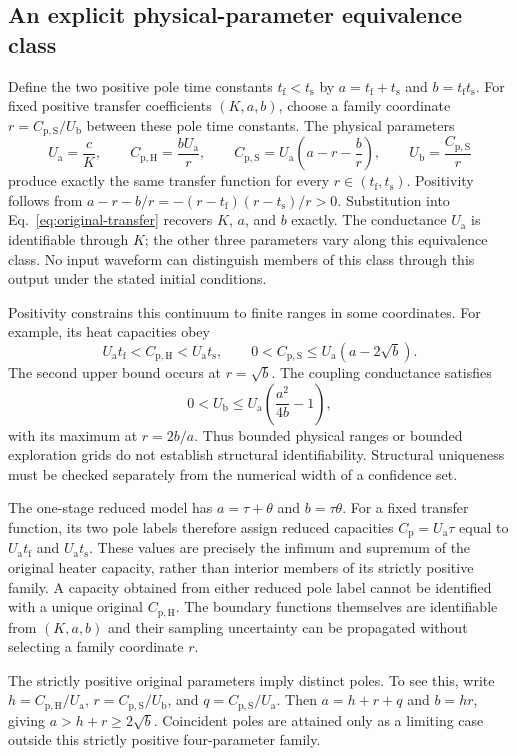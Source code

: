 \documentclass[11pt]{article}
\newcommand{\Ua}{U_{\mathrm a}}
\newcommand{\Ub}{U_{\mathrm b}}
\newcommand{\Cp}{C_{\mathrm p}}
\newcommand{\CpH}{C_{\mathrm{p,H}}}
\newcommand{\CpS}{C_{\mathrm{p,S}}}
\begin{document}
\subsection{An explicit physical-parameter equivalence class}
Define the two positive pole time constants $t_{\mathrm f}<t_{\mathrm s}$ by
$a=t_{\mathrm f}+t_{\mathrm s}$ and $b=t_{\mathrm f}t_{\mathrm s}$. For fixed
positive transfer coefficients $(K,a,b)$, choose a family coordinate
$r=\CpS/\Ub$ between these pole time constants. The physical parameters
\begin{equation}
 \Ua=\frac{c}{K},\qquad
 \CpH=\frac{b\Ua}{r},\qquad
 \CpS=\Ua\left(a-r-\frac{b}{r}\right),\qquad
 \Ub=\frac{\CpS}{r}
 \label{eq:equivalent}
\end{equation}
produce exactly the same transfer function for every
$r\in(t_{\mathrm f},t_{\mathrm s})$. Positivity follows from
$a-r-b/r=-(r-t_{\mathrm f})(r-t_{\mathrm s})/r>0$. Substitution into
Eq.~\eqref{eq:original-transfer} recovers $K$, $a$, and $b$ exactly.
The conductance $\Ua$ is identifiable through $K$; the other three parameters
vary along this equivalence class. No input waveform can distinguish members
of this class through this output under the stated initial conditions.

Positivity constrains this continuum to finite ranges in some coordinates.
For example, its heat capacities obey
\[
 \Ua t_{\mathrm f}<\CpH<\Ua t_{\mathrm s},\qquad
 0<\CpS\leq\Ua\left(a-2\sqrt b\right).
\]
The second upper bound occurs at $r=\sqrt b$.
The coupling conductance satisfies
\[
 0<\Ub\leq\Ua\left(\frac{a^2}{4b}-1\right),
\]
with its maximum at $r=2b/a$.
Thus bounded physical ranges or bounded exploration grids do not establish
structural identifiability. Structural uniqueness must be checked separately
from the numerical width of a confidence set.

The one-stage reduced model has $a=\tau+\theta$ and $b=\tau\theta$.
For a fixed transfer function, its two pole labels therefore assign reduced
capacities $\Cp=\Ua\tau$ equal to $\Ua t_{\mathrm f}$ and
$\Ua t_{\mathrm s}$. These values are precisely the infimum and supremum of
the original heater capacity, rather than interior members of its strictly
positive family. A capacity obtained from either reduced pole label cannot
be identified with a unique original $\CpH$. The boundary functions themselves
are identifiable from $(K,a,b)$ and their sampling uncertainty can be propagated
without selecting a family coordinate $r$.

The strictly positive original parameters imply distinct poles. To see this,
write $h=\CpH/\Ua$, $r=\CpS/\Ub$, and $q=\CpS/\Ua$. Then $a=h+r+q$
and $b=hr$, giving $a>h+r\geq2\sqrt b$. Coincident poles are attained only
as a limiting case outside this strictly positive four-parameter family.
\end{document}
